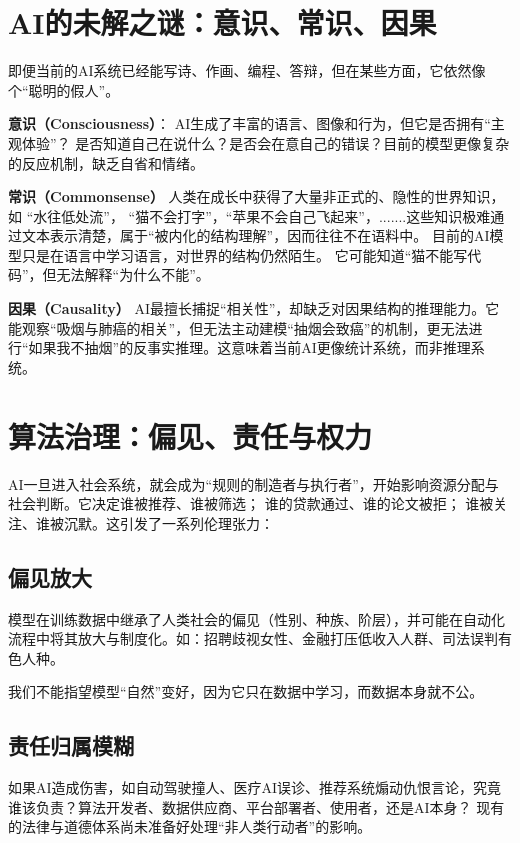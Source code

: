 
\section{AI的未解之谜：意识、常识、因果}

即便当前的AI系统已经能写诗、作画、编程、答辩，但在某些方面，它依然像个“聪明的假人”。

\textbf{意识（Consciousness）}：
AI生成了丰富的语言、图像和行为，但它是否拥有“主观体验”？  
是否知道自己在说什么？是否会在意自己的错误？目前的模型更像复杂的反应机制，缺乏自省和情绪。  

\textbf{常识（Commonsense）}
人类在成长中获得了大量非正式的、隐性的世界知识，如 “水往低处流”， “猫不会打字”，“苹果不会自己飞起来”，.......这些知识极难通过文本表示清楚，属于“被内化的结构理解”，因而往往不在语料中。
目前的AI模型只是在语言中学习语言，对世界的结构仍然陌生。 它可能知道“猫不能写代码”，但无法解释“为什么不能”。

\textbf{因果（Causality）}
AI最擅长捕捉“相关性”，却缺乏对因果结构的推理能力。它能观察“吸烟与肺癌的相关”，但无法主动建模“抽烟会致癌”的机制，更无法进行“如果我不抽烟”的反事实推理。这意味着当前AI更像统计系统，而非推理系统。

\section{算法治理：偏见、责任与权力}

AI一旦进入社会系统，就会成为“规则的制造者与执行者”，开始影响资源分配与社会判断。它决定谁被推荐、谁被筛选； 谁的贷款通过、谁的论文被拒； 谁被关注、谁被沉默。这引发了一系列伦理张力：

\subsection*{偏见放大}
模型在训练数据中继承了人类社会的偏见（性别、种族、阶层），并可能在自动化流程中将其放大与制度化。如：招聘歧视女性、金融打压低收入人群、司法误判有色人种。

我们不能指望模型“自然”变好，因为它只在数据中学习，而数据本身就不公。

\subsection*{责任归属模糊}
如果AI造成伤害，如自动驾驶撞人、医疗AI误诊、推荐系统煽动仇恨言论，究竟谁该负责？算法开发者、数据供应商、平台部署者、使用者，还是AI本身？
现有的法律与道德体系尚未准备好处理“非人类行动者”的影响。

